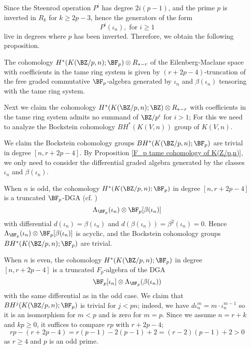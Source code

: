 Since the Steenrod operation $P^i$ has degree $2i(p-1)$, and the prime $p$ is inverted in $R_{k}$ for $k\geq 2p-3$, hence the generators of the form
$$
P^i(\iota_n), \text{ for } i\geq 1
$$  
live in degrees where $p$ has been inverted. Therefore, we obtain the following proposition.
\begin{proposition}
\label{F_p tame cohomology of K(Z/p,n)}
	The cohomology $H^*(K(\BZ/p,n);\BF_p)\otimes R_{*-r}$ of the Eilenberg-Maclane space with coefficients in the tame ring system is given by $(r+2p-4)$-truncation of the free graded commutative $\BF_p$-algebra generated by 
	$\iota_n$ and $\beta(\iota_n)$ tensoring with the tame ring system.
\end{proposition}

Next we claim the cohomology $H^*(K(\BZ/p,n);\BZ)\otimes R_{*-r}$ with coefficients in the tame ring system admits no summand of $\BZ/p^i$ for $i>1$;
For this we need to analyze the Bockstein cohomology $BH^*(K(V,n))$ group of $K(V,n)$.


We claim the Bockstein cohomology groups $BH^*(K(\BZ/p,n);\BF_p)$ are trivial in degree $[n, r+2p-4]$.
By Proposition \ref{F_p tame cohomology of K(Z/p,n)}, we only need to consider the differential graded algebra generated by the classes $\iota_n$ and $\beta(\iota_n)$. 

When $n$ is odd, the cohomology $H^*(K(\BZ/p,n);\BF_p)$ in degree $[n, r+2p-4]$ is a truncated $\BF_{p}$-DGA (cf. \cite[Section 10.1]{McCleary_SS})
$$
\Lambda_{\BF_p}(\iota_n)\otimes \BF_p[\beta(\iota_n)]
$$
with differential $d(\iota_n)=\beta(\iota_n)$ and $d(\beta(\iota_n))=\beta^2(\iota_n)=0$. Hence $\Lambda_{\BF_p}(\iota_n)\otimes \BF_p[\beta(\iota_n)]$ is acyclic, and the Bockstein cohomology groups $BH^*(K(\BZ/p,n);\BF_p)$ are trivial.

When $n$ is even, the cohomology $H^*(K(\BZ/p,n);\BF_p)$ in degree $[n, r+2p-4]$ is a truncated $F_{p}$-algebra of the DGA
$$
 \BF_p[\iota_n]\otimes \Lambda_{\BF_p}(\beta(\iota_n))
$$
with the same differential as in the odd case. We claim that $BH^j(K(\BZ/p,n);\BF_p)$ is trivial for $j<pn$; indeed, we have $d\iota_n^m=m\cdot\iota_n^{m-1}$ so it is an isomorphism for $m<p$ and is zero for $m=p$. 
Since we assume $n=r+k$ and $kp\geq 0$, it suffices to compare $rp$ with $r+2p-4$;
\begin{equation*}
    rp - (r+2p-4) = r(p-1) -2(p-1) + 2 = (r-2)(p-1)+2>0
\end{equation*}
as $r\geq 4$ and $p$ is an odd prime.

